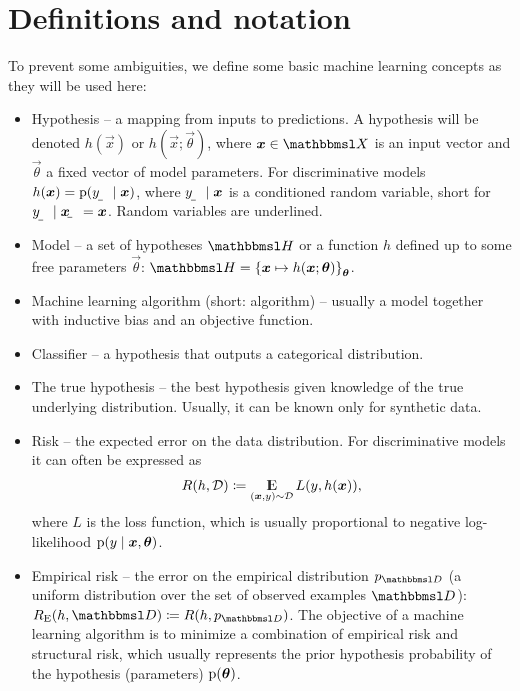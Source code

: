 \documentclass[oneside]{book}
\begin{document}
\section{Definitions and notation}

To prevent some ambiguities, we define some basic machine learning concepts as they will be used here:
\begin{itemize}
	\item Hypothesis -- a mapping from inputs to predictions. A hypothesis will be denoted $h(\vec x)$ or $h(\vec x;\vec\theta)$, where $\vec x\in\set X$ is an input vector and $\vec\theta$ a fixed vector of model parameters. For discriminative models $h(\vec x)=\p(\rvar y\mid\vec x)$, where $\rvar y\mid\vec x$ is a conditioned random variable, short for $\rvar y\mid\rvec x=\vec x$. Random variables are underlined.
	\item Model -- a set of hypotheses $\set H$ or a function $h$ defined up to some free parameters $\vec\theta$: $\set H=\cbr{\vec x\mapsto h(\vec x;\vec\theta)}_{\vec\theta}$.
	\item Machine learning algorithm (short: algorithm) -- usually a model together with inductive bias and an objective function. %
	\item Classifier -- a hypothesis that outputs a categorical distribution.
	\item The true hypothesis -- the best hypothesis given knowledge of the true underlying distribution. Usually, it can be known only for synthetic data.
	\item Risk -- the expected error on the data distribution. For discriminative models it can often be expressed as
	\begin{align}
	R(h,\distrib D)\coloneqq\E_{(\vec x,y)\sim\distrib D}L(y, h(\vec x)) \text{,}
	\end{align} where $L$ is the loss function, which is usually proportional to negative log-likelihood $\p(y\mid\vec x,\vec\theta)$.
	\item Empirical risk -- the error on the empirical distribution $p_{\set D}$ (a uniform distribution over the set of observed examples $\set D$): $R_\text{E}(h,\set D)\coloneqq R(h,p_{\set D})$. The objective of a machine learning algorithm is to minimize a combination of empirical risk and structural risk, which usually represents the prior hypothesis probability of the hypothesis (parameters) $\p(\vec\theta)$.
\end{itemize}
\end{document}

